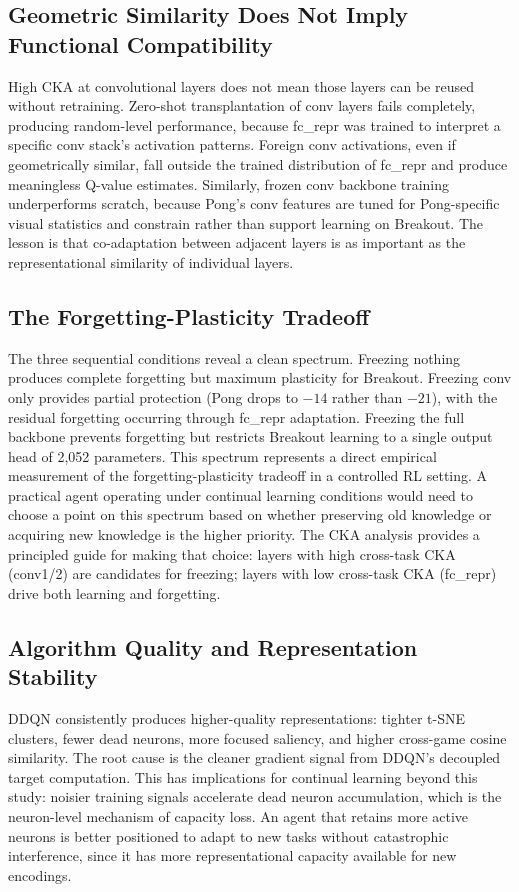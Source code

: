 \documentclass[a4paper]{article}
\begin{document}
\subsection{Geometric Similarity Does Not Imply Functional Compatibility}

High CKA at convolutional layers does not mean those layers can be reused without retraining. Zero-shot transplantation of conv layers fails completely, producing random-level performance, because fc\_repr was trained to interpret a specific conv stack's activation patterns. Foreign conv activations, even if geometrically similar, fall outside the trained distribution of fc\_repr and produce meaningless Q-value estimates. Similarly, frozen conv backbone training underperforms scratch, because Pong's conv features are tuned for Pong-specific visual statistics and constrain rather than support learning on Breakout. The lesson is that co-adaptation between adjacent layers is as important as the representational similarity of individual layers.

\subsection{The Forgetting-Plasticity Tradeoff}

The three sequential conditions reveal a clean spectrum. Freezing nothing produces complete forgetting but maximum plasticity for Breakout. Freezing conv only provides partial protection (Pong drops to $-14$ rather than $-21$), with the residual forgetting occurring through fc\_repr adaptation. Freezing the full backbone prevents forgetting but restricts Breakout learning to a single output head of 2,052 parameters. This spectrum represents a direct empirical measurement of the forgetting-plasticity tradeoff in a controlled RL setting. A practical agent operating under continual learning conditions would need to choose a point on this spectrum based on whether preserving old knowledge or acquiring new knowledge is the higher priority. The CKA analysis provides a principled guide for making that choice: layers with high cross-task CKA (conv1/2) are candidates for freezing; layers with low cross-task CKA (fc\_repr) drive both learning and forgetting.

\subsection{Algorithm Quality and Representation Stability}

DDQN consistently produces higher-quality representations: tighter t-SNE clusters, fewer dead neurons, more focused saliency, and higher cross-game cosine similarity. The root cause is the cleaner gradient signal from DDQN's decoupled target computation. This has implications for continual learning beyond this study: noisier training signals accelerate dead neuron accumulation, which is the neuron-level mechanism of capacity loss. An agent that retains more active neurons is better positioned to adapt to new tasks without catastrophic interference, since it has more representational capacity available for new encodings.
\end{document}
